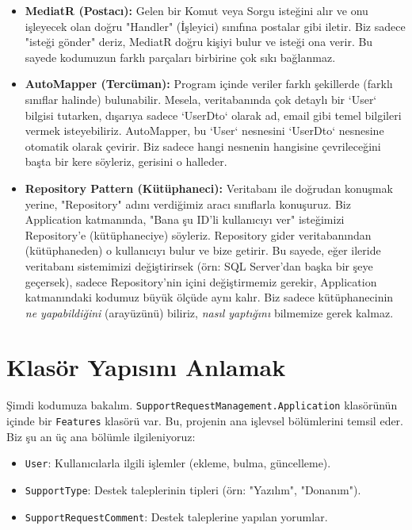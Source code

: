 \documentclass[11pt, a4paper]{article}
\begin{document}
\begin{itemize}
    \item \textbf{MediatR (Postacı):} Gelen bir Komut veya Sorgu isteğini alır ve onu işleyecek olan doğru "Handler" (İşleyici) sınıfına postalar gibi iletir. Biz sadece "isteği gönder" deriz, MediatR doğru kişiyi bulur ve isteği ona verir. Bu sayede kodumuzun farklı parçaları birbirine çok sıkı bağlanmaz.
    \item \textbf{AutoMapper (Tercüman):} Program içinde veriler farklı şekillerde (farklı sınıflar halinde) bulunabilir. Mesela, veritabanında çok detaylı bir `User` bilgisi tutarken, dışarıya sadece `UserDto` olarak ad, email gibi temel bilgileri vermek isteyebiliriz. AutoMapper, bu `User` nesnesini `UserDto` nesnesine otomatik olarak çevirir. Biz sadece hangi nesnenin hangisine çevrileceğini başta bir kere söyleriz, gerisini o halleder.
    \item \textbf{Repository Pattern (Kütüphaneci):} Veritabanı ile doğrudan konuşmak yerine, "Repository" adını verdiğimiz aracı sınıflarla konuşuruz. Biz Application katmanında, "Bana şu ID'li kullanıcıyı ver" isteğimizi Repository'e (kütüphaneciye) söyleriz. Repository gider veritabanından (kütüphaneden) o kullanıcıyı bulur ve bize getirir. Bu sayede, eğer ileride veritabanı sistemimizi değiştirirsek (örn: SQL Server'dan başka bir şeye geçersek), sadece Repository'nin içini değiştirmemiz gerekir, Application katmanındaki kodumuz büyük ölçüde aynı kalır. Biz sadece kütüphanecinin \emph{ne yapabildiğini} (arayüzünü) biliriz, \emph{nasıl yaptığını} bilmemize gerek kalmaz.
\end{itemize}

\section{Klasör Yapısını Anlamak}

Şimdi kodumuza bakalım. \texttt{SupportRequestManagement.Application} klasörünün içinde bir \texttt{Features} klasörü var. Bu, projenin ana işlevsel bölümlerini temsil eder. Biz şu an üç ana bölümle ilgileniyoruz:
\begin{itemize}
    \item \texttt{User}: Kullanıcılarla ilgili işlemler (ekleme, bulma, güncelleme).
    \item \texttt{SupportType}: Destek taleplerinin tipleri (örn: "Yazılım", "Donanım").
    \item \texttt{SupportRequestComment}: Destek taleplerine yapılan yorumlar.
\end{itemize}
\end{document}
